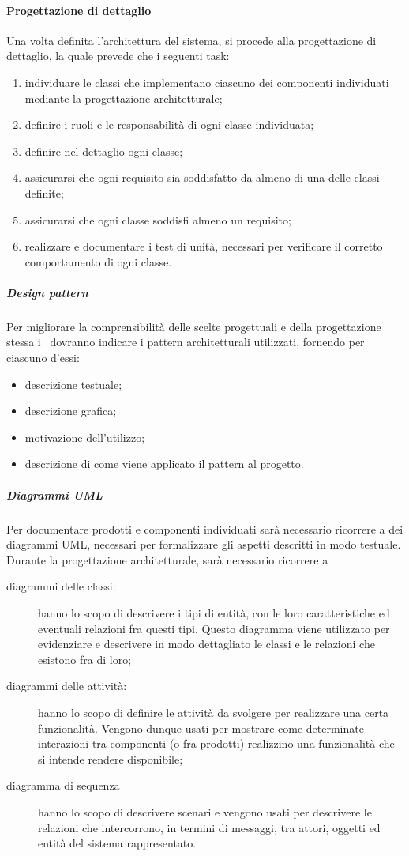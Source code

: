 \documentclass[../NormeProgetto.text]{subfiles}
\begin{document}
		\paragraph{Progettazione di dettaglio}
			Una volta definita l'architettura del sistema, si procede alla progettazione di dettaglio, la quale prevede che i seguenti task\g:
			\begin{enumerate}
				\item individuare le classi che implementano ciascuno dei componenti individuati mediante la progettazione architetturale;
				\item definire i ruoli e le responsabilità di ogni classe individuata;
				\item definire nel dettaglio ogni classe;
				\item assicurarsi che ogni requisito sia soddisfatto da almeno di una delle classi definite;
				\item assicurarsi che ogni classe soddisfi almeno un requisito;
				\item realizzare e documentare i test di unità, necessari per verificare il corretto comportamento di ogni classe.
			\end{enumerate}
			
			\subparagraph{Design pattern}
				Per migliorare la comprensibilità delle scelte progettuali e della progettazione stessa i \progettisti\ dovranno indicare i pattern architetturali utilizzati, fornendo per ciascuno d'essi:
				\begin{itemize}
					\item descrizione testuale;
					\item descrizione grafica;
					\item motivazione dell'utilizzo;
					\item descrizione di come viene applicato il pattern al progetto.
				\end{itemize}
			\subparagraph{Diagrammi UML}
				Per documentare prodotti e componenti individuati sarà necessario ricorrere a dei diagrammi UML\g, necessari per formalizzare gli aspetti descritti in modo testuale. Durante la progettazione architetturale, sarà necessario ricorrere a 
				\begin{description}
					\item[diagrammi delle classi:] hanno lo scopo di descrivere i tipi di entità, con le loro caratteristiche ed eventuali relazioni fra questi tipi. Questo diagramma viene utilizzato per evidenziare e descrivere in modo dettagliato le classi e le relazioni che esistono fra di loro;
					\item[diagrammi delle attività:]  hanno lo scopo di definire le attività da svolgere per realizzare una certa funzionalità. Vengono dunque usati per mostrare come determinate interazioni tra componenti (o fra prodotti) realizzino una funzionalità che si intende rendere disponibile;
					\item[diagramma di sequenza] hanno lo scopo di descrivere scenari e vengono usati per descrivere le relazioni che intercorrono, in termini di messaggi, tra attori, oggetti ed entità del sistema rappresentato.
				\end{description}
			
\end{document}

